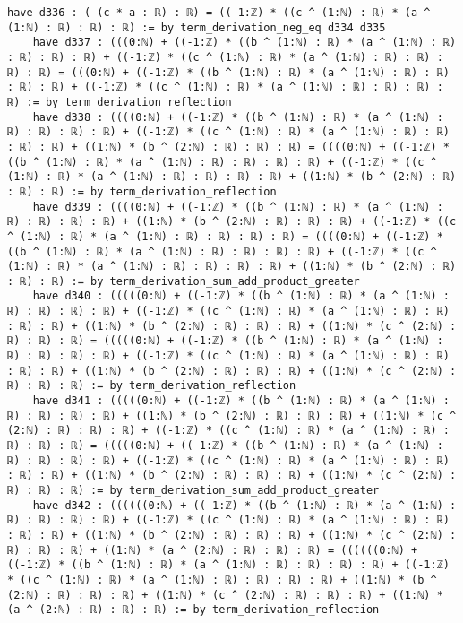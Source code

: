 \documentclass{article}
\begin{document}
\begin{tcolorbox}[colback=white!10, width=\linewidth]
\begin{lstlisting}[language=Lean4]
    have d336 : (-(c * a : ℝ) : ℝ) = ((-1:ℤ) * ((c ^ (1:ℕ) : ℝ) * (a ^ (1:ℕ) : ℝ) : ℝ) : ℝ) := by term_derivation_neg_eq d334 d335
    have d337 : (((0:ℕ) + ((-1:ℤ) * ((b ^ (1:ℕ) : ℝ) * (a ^ (1:ℕ) : ℝ) : ℝ) : ℝ) : ℝ) + ((-1:ℤ) * ((c ^ (1:ℕ) : ℝ) * (a ^ (1:ℕ) : ℝ) : ℝ) : ℝ) : ℝ) = (((0:ℕ) + ((-1:ℤ) * ((b ^ (1:ℕ) : ℝ) * (a ^ (1:ℕ) : ℝ) : ℝ) : ℝ) : ℝ) + ((-1:ℤ) * ((c ^ (1:ℕ) : ℝ) * (a ^ (1:ℕ) : ℝ) : ℝ) : ℝ) : ℝ) := by term_derivation_reflection
    have d338 : ((((0:ℕ) + ((-1:ℤ) * ((b ^ (1:ℕ) : ℝ) * (a ^ (1:ℕ) : ℝ) : ℝ) : ℝ) : ℝ) + ((-1:ℤ) * ((c ^ (1:ℕ) : ℝ) * (a ^ (1:ℕ) : ℝ) : ℝ) : ℝ) : ℝ) + ((1:ℕ) * (b ^ (2:ℕ) : ℝ) : ℝ) : ℝ) = ((((0:ℕ) + ((-1:ℤ) * ((b ^ (1:ℕ) : ℝ) * (a ^ (1:ℕ) : ℝ) : ℝ) : ℝ) : ℝ) + ((-1:ℤ) * ((c ^ (1:ℕ) : ℝ) * (a ^ (1:ℕ) : ℝ) : ℝ) : ℝ) : ℝ) + ((1:ℕ) * (b ^ (2:ℕ) : ℝ) : ℝ) : ℝ) := by term_derivation_reflection
    have d339 : ((((0:ℕ) + ((-1:ℤ) * ((b ^ (1:ℕ) : ℝ) * (a ^ (1:ℕ) : ℝ) : ℝ) : ℝ) : ℝ) + ((1:ℕ) * (b ^ (2:ℕ) : ℝ) : ℝ) : ℝ) + ((-1:ℤ) * ((c ^ (1:ℕ) : ℝ) * (a ^ (1:ℕ) : ℝ) : ℝ) : ℝ) : ℝ) = ((((0:ℕ) + ((-1:ℤ) * ((b ^ (1:ℕ) : ℝ) * (a ^ (1:ℕ) : ℝ) : ℝ) : ℝ) : ℝ) + ((-1:ℤ) * ((c ^ (1:ℕ) : ℝ) * (a ^ (1:ℕ) : ℝ) : ℝ) : ℝ) : ℝ) + ((1:ℕ) * (b ^ (2:ℕ) : ℝ) : ℝ) : ℝ) := by term_derivation_sum_add_product_greater
    have d340 : (((((0:ℕ) + ((-1:ℤ) * ((b ^ (1:ℕ) : ℝ) * (a ^ (1:ℕ) : ℝ) : ℝ) : ℝ) : ℝ) + ((-1:ℤ) * ((c ^ (1:ℕ) : ℝ) * (a ^ (1:ℕ) : ℝ) : ℝ) : ℝ) : ℝ) + ((1:ℕ) * (b ^ (2:ℕ) : ℝ) : ℝ) : ℝ) + ((1:ℕ) * (c ^ (2:ℕ) : ℝ) : ℝ) : ℝ) = (((((0:ℕ) + ((-1:ℤ) * ((b ^ (1:ℕ) : ℝ) * (a ^ (1:ℕ) : ℝ) : ℝ) : ℝ) : ℝ) + ((-1:ℤ) * ((c ^ (1:ℕ) : ℝ) * (a ^ (1:ℕ) : ℝ) : ℝ) : ℝ) : ℝ) + ((1:ℕ) * (b ^ (2:ℕ) : ℝ) : ℝ) : ℝ) + ((1:ℕ) * (c ^ (2:ℕ) : ℝ) : ℝ) : ℝ) := by term_derivation_reflection
    have d341 : (((((0:ℕ) + ((-1:ℤ) * ((b ^ (1:ℕ) : ℝ) * (a ^ (1:ℕ) : ℝ) : ℝ) : ℝ) : ℝ) + ((1:ℕ) * (b ^ (2:ℕ) : ℝ) : ℝ) : ℝ) + ((1:ℕ) * (c ^ (2:ℕ) : ℝ) : ℝ) : ℝ) + ((-1:ℤ) * ((c ^ (1:ℕ) : ℝ) * (a ^ (1:ℕ) : ℝ) : ℝ) : ℝ) : ℝ) = (((((0:ℕ) + ((-1:ℤ) * ((b ^ (1:ℕ) : ℝ) * (a ^ (1:ℕ) : ℝ) : ℝ) : ℝ) : ℝ) + ((-1:ℤ) * ((c ^ (1:ℕ) : ℝ) * (a ^ (1:ℕ) : ℝ) : ℝ) : ℝ) : ℝ) + ((1:ℕ) * (b ^ (2:ℕ) : ℝ) : ℝ) : ℝ) + ((1:ℕ) * (c ^ (2:ℕ) : ℝ) : ℝ) : ℝ) := by term_derivation_sum_add_product_greater
    have d342 : ((((((0:ℕ) + ((-1:ℤ) * ((b ^ (1:ℕ) : ℝ) * (a ^ (1:ℕ) : ℝ) : ℝ) : ℝ) : ℝ) + ((-1:ℤ) * ((c ^ (1:ℕ) : ℝ) * (a ^ (1:ℕ) : ℝ) : ℝ) : ℝ) : ℝ) + ((1:ℕ) * (b ^ (2:ℕ) : ℝ) : ℝ) : ℝ) + ((1:ℕ) * (c ^ (2:ℕ) : ℝ) : ℝ) : ℝ) + ((1:ℕ) * (a ^ (2:ℕ) : ℝ) : ℝ) : ℝ) = ((((((0:ℕ) + ((-1:ℤ) * ((b ^ (1:ℕ) : ℝ) * (a ^ (1:ℕ) : ℝ) : ℝ) : ℝ) : ℝ) + ((-1:ℤ) * ((c ^ (1:ℕ) : ℝ) * (a ^ (1:ℕ) : ℝ) : ℝ) : ℝ) : ℝ) + ((1:ℕ) * (b ^ (2:ℕ) : ℝ) : ℝ) : ℝ) + ((1:ℕ) * (c ^ (2:ℕ) : ℝ) : ℝ) : ℝ) + ((1:ℕ) * (a ^ (2:ℕ) : ℝ) : ℝ) : ℝ) := by term_derivation_reflection

\end{lstlisting}
\end{tcolorbox}
\end{document}
